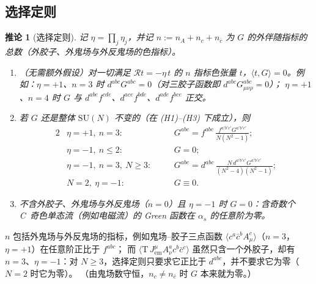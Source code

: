 \documentclass[UTF8,a4paper,11pt,fontset=fandol]{ctexart}
\theoremstyle{cplain}
\newtheorem{corollary}[theorem]{推论}
\theoremstyle{cdefinition}
\theoremstyle{cremark}
\numberwithin{equation}{section}
\newcommand{\Rop}{\mathcal{R}}                       %
\begin{document}
\subsection{选择定则}\label{sec:thmII-selection}

\begin{corollary}[选择定则]\label{cor:selection}
记 $\eta=\prod_j\eta_j$，并记 $n:=n_A+n_c+n_{\bar c}$ 为 $G$ 的外伴随指标的总数（外胶子、外鬼场与外反鬼场的色指标）。
\begin{enumerate}[label=(\alph*)]
\item （无需额外假设）对一切满足 $\Rop t=-\eta\,t$ 的 $n$ 指标色张量 $t$，$\langle t,G\rangle=0$。例如：$\eta=+1$、$n=3$ 时 $d^{abc}G^{abc}=0$（对三胶子函数即 $d^{abc}G^{abc}_{\mu\nu\rho}=0$）；
$\eta=+1$、$n=4$ 时 $G$ 与 $d^{abe}f^{cde}$、$d^{ace}f^{bde}$、$d^{ade}f^{bce}$ 正交。
\item 若 $G$ 还是整体 $\mathrm{SU}(N)$ 不变的（在 (H1)--(H3) 下成立），则
\begin{alignat*}{2}
&\eta=+1,\ n=3: &\quad& G^{abc}=f^{abc}\,\frac{f^{a'b'c'}G^{a'b'c'}}{N(N^2-1)};\\
&\eta=-1,\ n\le2: && G=0;\\
&\eta=-1,\ n=3,\ N\ge3: && G^{abc}=d^{abc}\,\frac{N\,d^{a'b'c'}G^{a'b'c'}}{(N^2-4)(N^2-1)};\\
&N=2,\ \eta=-1: && G\equiv0.
\end{alignat*}
\item 不含外胶子、外鬼场与外反鬼场（$n=0$）且 $\eta=-1$ 时 $G=0$：含奇数个 C~奇色单态流（例如电磁流）的 Green 函数在 $\alpha_s$ 的任意阶为零。
\end{enumerate}
\end{corollary}

$n$ 包括外鬼场与外反鬼场的指标，例如鬼场--胶子三点函数 $\langle c^a\bar c^bA^c_\mu\rangle$（$n=3$，$\eta=+1$）在任意阶正比于 $f^{abc}$；
而 $\langle\mathrm T\,J^\mu_{\mathrm{em}}A^a_\nu c^b\bar c^c\rangle$ 虽然只含一个外胶子，却有 $n=3$、$\eta=-1$：对 $N\ge3$，选择定则只要求它正比于 $d^{abc}$，并不要求它为零（$N=2$ 时它为零）。
（由鬼场数守恒，$n_c\neq n_{\bar c}$ 时 $G$ 本来就为零。）
\end{document}
